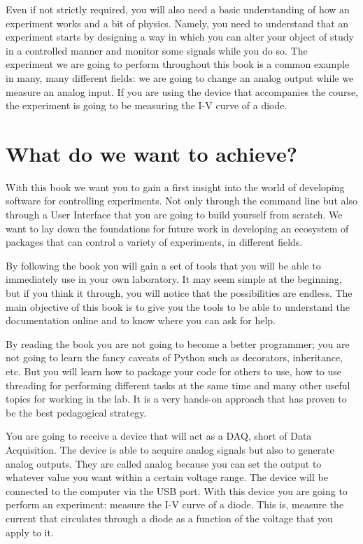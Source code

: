 Even if not strictly required, you will also need a basic understanding of how an experiment works and a bit of physics. Namely, you need to understand that an experiment starts by designing a way in which you can alter your object of study in a controlled manner and monitor some signals while you do so. The experiment we are going to perform throughout this book is a common example in many, many different fields: we are going to change an analog output while we measure an analog input. If you are using the device that accompanies the course, the experiment is going to be measuring the I-V curve of a diode.

\section{What do we want to achieve?}

With this book we want you to gain a first insight into the world of developing software for controlling experiments. Not only through the command line but also through a User Interface that you are going to build yourself from scratch. We want to lay down the foundations for future work in developing an ecosystem of packages that can control a variety of experiments, in different fields.

By following the book you will gain a set of tools that you will be able to immediately use in your own laboratory. It may seem simple at the beginning, but if you think it through, you will notice that the possibilities are endless. The main objective of this book is to give you the tools to be able to understand the documentation online and to know where you can ask for help.

By reading the book you are not going to become a better programmer; you are not going to learn the fancy caveats of Python such as decorators, inheritance, etc. But you will learn how to package your code for others to use, how to use threading for performing different tasks at the same time and many other useful topics for working in the lab. It is a very hands-on approach that has proven to be the best pedagogical strategy.

You are going to receive a device that will act as a DAQ, short of Data Acquisition. The device is able to acquire analog signals but also to generate analog outputs. They are called analog because you can set the output to whatever value you want within a certain voltage range. The device will be connected to the computer via the USB port. With this device you are going to perform an experiment: measure the I-V curve of a diode. This is, measure the current that circulates through a diode as a function of the voltage that you apply to it.

